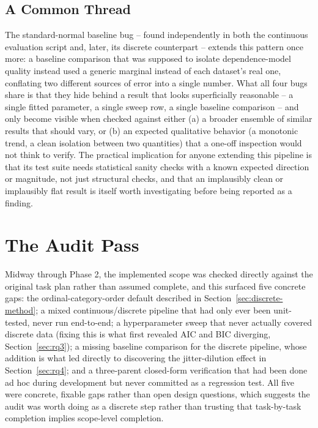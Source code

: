\documentclass[
  english,
  class=report,
  accentcolor=2c,
  marginpar=false,
  parskip=half-,
  fontsize=11pt,
  ruledheaders=false,
  pdfa=false,
  IMRAD=false,
  thesis={type=master}
]{tudapub}
\begin{document}
\subsection{A Common Thread}
The standard-normal baseline bug -- found independently in both the
continuous evaluation script and, later, its discrete counterpart --
extends this pattern once more: a baseline comparison that was supposed to
isolate dependence-model quality instead used a generic marginal instead
of each dataset's real one, conflating two different sources of error into
a single number. What all four bugs share is that they hide behind a
result that looks superficially reasonable -- a single fitted parameter,
a single sweep row, a single baseline comparison -- and only become
visible when checked against either (a) a broader ensemble of similar
results that should vary, or (b) an expected qualitative behavior (a
monotonic trend, a clean isolation between two quantities) that a
one-off inspection would not think to verify. The practical implication
for anyone extending this pipeline is that its test suite needs
statistical sanity checks with a known expected direction or magnitude,
not just structural checks, and that an implausibly clean or implausibly
flat result is itself worth investigating before being reported as a
finding.

\section{The Audit Pass}
\label{sec:audit}
Midway through Phase 2, the implemented scope was checked directly against
the original task plan rather than assumed complete, and this surfaced five
concrete gaps: the ordinal-category-order default described in
Section~\ref{sec:discrete-method}; a mixed continuous/discrete pipeline that
had only ever been unit-tested, never run end-to-end; a hyperparameter
sweep that never actually covered discrete data (fixing this is what first
revealed AIC and BIC diverging, Section~\ref{sec:rq3}); a missing baseline
comparison for the discrete pipeline, whose addition is what led directly to
discovering the jitter-dilution effect in Section~\ref{sec:rq4}; and a
three-parent closed-form verification that had been done ad hoc during
development but never committed as a regression test. All five were
concrete, fixable gaps rather than open design questions, which suggests the
audit was worth doing as a discrete step rather than trusting that
task-by-task completion implies scope-level completion.
\end{document}
